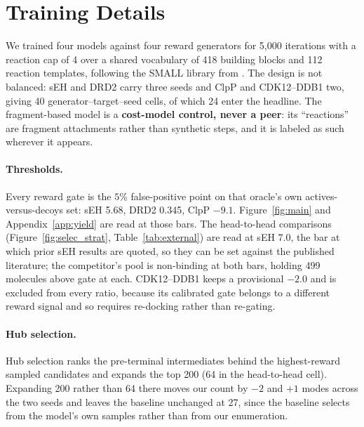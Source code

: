 \documentclass{article}
\newcommand{\checkval}[1]{#1}
\begin{document}
\section{Training Details}
\label{app:training}
We trained four models against four reward generators for \checkval{5{,}000} iterations with a reaction cap of 4 over a shared vocabulary of \checkval{418} building blocks and \checkval{112} reaction templates, following the SMALL library from \cite{gainski2026scent}. The design is not balanced: sEH and DRD2 carry three seeds and ClpP and CDK12--DDB1 two, giving \checkval{40} generator--target--seed cells, of which \checkval{24} enter the headline. The fragment-based model is a \textbf{cost-model control, never a peer}: its ``reactions'' are fragment attachments rather than synthetic steps, and it is labeled as such wherever it appears.

\paragraph{Thresholds.}
Every reward gate is the \checkval{$5\%$} false-positive point on that oracle's own actives-versus-decoys set: sEH \checkval{5.68}, DRD2 \checkval{0.345}, ClpP \checkval{$-9.1$}. Figure~\ref{fig:main} and Appendix~\ref{app:yield} are read at those bars. The head-to-head comparisons (Figure~\ref{fig:selec_strat}, Table~\ref{tab:external}) are read at sEH \checkval{7.0}, the bar at which prior sEH results are quoted, so they can be set against the published literature; the competitor's pool is non-binding at both bars, holding \checkval{499} molecules above gate at each. CDK12--DDB1 keeps a provisional \checkval{$-2.0$} and is excluded from every ratio, because its calibrated gate belongs to a different reward signal and so requires re-docking rather than re-gating.

\paragraph{Hub selection.}
Hub selection ranks the pre-terminal intermediates behind the highest-reward sampled candidates and expands the top \checkval{200} (\checkval{64} in the head-to-head cell). Expanding \checkval{200} rather than \checkval{64} there moves our count by \checkval{$-2$} and \checkval{$+1$} modes across the two seeds and leaves the baseline unchanged at \checkval{27}, since the baseline selects from the model's own samples rather than from our enumeration.
\end{document}
